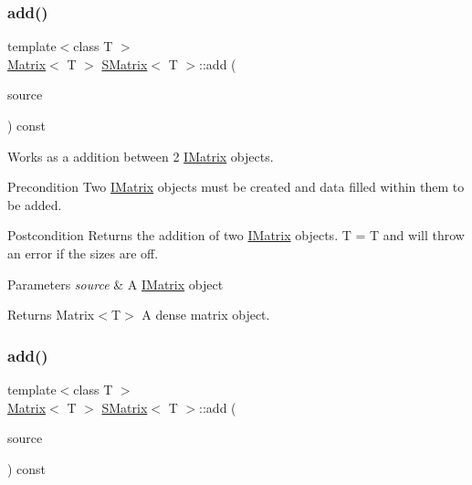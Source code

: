 \subsubsection{\texorpdfstring{add()}{add()}\hspace{0.1cm}{\footnotesize\ttfamily [3/6]}}
{\footnotesize\ttfamily template$<$class T $>$ \\
\mbox{\hyperlink{class_matrix}{Matrix}}$<$ T $>$ \mbox{\hyperlink{class_s_matrix}{S\+Matrix}}$<$ T $>$\+::add (\begin{DoxyParamCaption}\item[{const \mbox{\hyperlink{class_i_matrix}{I\+Matrix}}$<$ \mbox{\hyperlink{class_l_matrix}{L\+Matrix}}$<$ T $>$, T $>$ \&}]{source }\end{DoxyParamCaption}) const}



Works as a addition between 2 \mbox{\hyperlink{class_i_matrix}{I\+Matrix}} objects. 

\begin{DoxyPrecond}{Precondition}
Two \mbox{\hyperlink{class_i_matrix}{I\+Matrix}} objects must be created and data filled within them to be added. 
\end{DoxyPrecond}
\begin{DoxyPostcond}{Postcondition}
Returns the addition of two \mbox{\hyperlink{class_i_matrix}{I\+Matrix}} objects. T = T and will throw an error if the sizes are off.
\end{DoxyPostcond}

\begin{DoxyParams}{Parameters}
{\em source} & A \mbox{\hyperlink{class_i_matrix}{I\+Matrix}} object \\
\hline
\end{DoxyParams}
\begin{DoxyReturn}{Returns}
Matrix$<$\+T$>$ A dense matrix object. 
\end{DoxyReturn}
\mbox{\label{class_s_matrix_a99cf55b562b27e77f3564f3aed5cff6d}} 
\subsubsection{\texorpdfstring{add()}{add()}\hspace{0.1cm}{\footnotesize\ttfamily [4/6]}}
{\footnotesize\ttfamily template$<$class T $>$ \\
\mbox{\hyperlink{class_matrix}{Matrix}}$<$ T $>$ \mbox{\hyperlink{class_s_matrix}{S\+Matrix}}$<$ T $>$\+::add (\begin{DoxyParamCaption}\item[{const \mbox{\hyperlink{class_i_matrix}{I\+Matrix}}$<$ \mbox{\hyperlink{class_u_matrix}{U\+Matrix}}$<$ T $>$, T $>$ \&}]{source }\end{DoxyParamCaption}) const}



